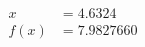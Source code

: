 \documentclass[preview]{standalone}
\begin{document}
\begin{align*}
x &= 4.6324\\f(x) &= 7.9827660
\end{align*}
\end{document}
